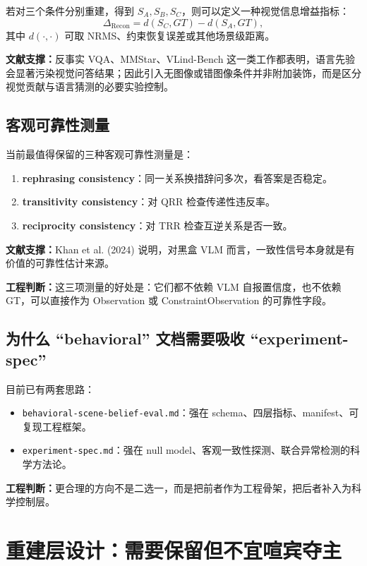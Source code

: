 \documentclass[11pt,a4paper]{ctexart}
\newcommand{\evidence}[1]{\textbf{文献支撑：}#1}
\newcommand{\engineering}[1]{\textbf{工程判断：}#1}
\begin{document}
若对三个条件分别重建，得到 $S_A, S_B, S_C$，则可以定义一种视觉信息增益指标：
\[
\Delta_{\mathrm{Recon}} = d(S_C, GT) - d(S_A, GT),
\]
其中 $d(\cdot, \cdot)$ 可取 NRMS、约束恢复误差或其他场景级距离。

\evidence{反事实 VQA、MMStar、VLind-Bench 这一类工作都表明，语言先验会显著污染视觉问答结果；因此引入无图像或错图像条件并非附加装饰，而是区分视觉贡献与语言猜测的必要实验控制。}

\subsection{客观可靠性测量}

当前最值得保留的三种客观可靠性测量是：
\begin{enumerate}[label=\arabic*.]
  \item \textbf{rephrasing consistency}：同一关系换措辞问多次，看答案是否稳定。
  \item \textbf{transitivity consistency}：对 QRR 检查传递性违反率。
  \item \textbf{reciprocity consistency}：对 TRR 检查互逆关系是否一致。
\end{enumerate}

\evidence{Khan et al. (2024) 说明，对黑盒 VLM 而言，一致性信号本身就是有价值的可靠性估计来源。}

\engineering{这三项测量的好处是：它们都不依赖 VLM 自报置信度，也不依赖 GT，可以直接作为 Observation 或 ConstraintObservation 的可靠性字段。}

\subsection{为什么 ``behavioral'' 文档需要吸收 ``experiment-spec''}

目前已有两套思路：
\begin{itemize}
  \item \texttt{behavioral-scene-belief-eval.md}：强在 schema、四层指标、manifest、可复现工程框架。
  \item \texttt{experiment-spec.md}：强在 null model、客观一致性探测、联合异常检测的科学方法论。
\end{itemize}

\engineering{更合理的方向不是二选一，而是把前者作为工程骨架，把后者补入为科学控制层。}

\section{重建层设计：需要保留但不宜喧宾夺主}
\end{document}

